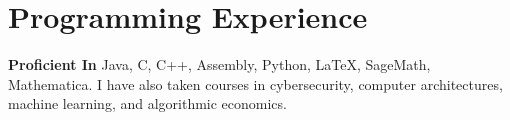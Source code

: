 \documentclass[11pt,letterpaper,sans]{moderncv}
\begin{document}
\section{Programming Experience}
\textbf{Proficient In} Java, C, C++, Assembly, Python, \LaTeX, SageMath, Mathematica. I have also taken courses in cybersecurity, computer architectures, machine learning, and algorithmic economics.



  
\end{document}

